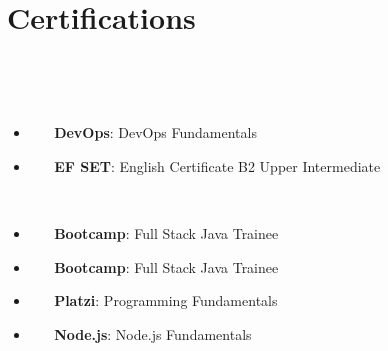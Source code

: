 \documentclass[letterpaper,11pt]{article}
\newcommand{\resumeItem}[2]{
  \item\small{
    \textbf{#1}{#2 \vspace{-2pt}}
  }
}
\newcommand{\resumeSubItemcol}[2]{\resumeItem{#1}{#2}\vspace{-8pt}}
\newcommand{\resumeSubHeadingListStart}{\begin{itemize}[leftmargin=*]}
\newcommand{\resumeSubHeadingListEnd}{\end{itemize}}
\begin{document}
\section{Certifications}
\vspace{-15pt}
  \begin{multicols}{2}
    \resumeSubHeadingListStart
    \resumeSubItemcol{DevOps}{: DevOps Fundamentals}
    \resumeSubItemcol{EF SET}{: English Certificate B2 Upper Intermediate}
    \resumeSubItemcol{Bootcamp}{: Full Stack Java Trainee}
    \resumeSubItemcol{Bootcamp}{: Full Stack Java Trainee}
    \resumeSubItemcol{Platzi}{: Programming Fundamentals}
    \resumeSubItemcol{Node.js}{: Node.js Fundamentals}
  \resumeSubHeadingListEnd
  \end{multicols}
\end{document}
